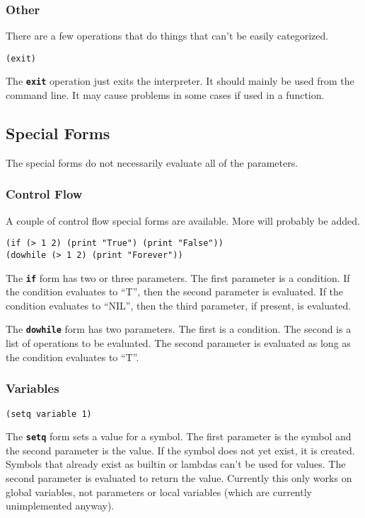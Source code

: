 \documentclass[10pt, openany]{book}
\newcommand{\operation}[1]{\textbf{\texttt{#1}}}
\begin{document}
\subsubsection{Other}
There are a few operations that do things that can't be easily categorized.
\begin{lstlisting}
(exit)
\end{lstlisting}
The \operation{exit} operation just exits the interpreter.  It should mainly be used from the command line.  It may cause problems in some cases if used in a function.

\subsection{Special Forms}
The special forms do not necessarily evaluate all of the parameters.

\subsubsection{Control Flow}
A couple of control flow special forms are available.  More will probably be added.
\begin{lstlisting}
(if (> 1 2) (print "True") (print "False"))
(dowhile (> 1 2) (print "Forever"))
\end{lstlisting}
The \operation{if} form has two or three parameters.  The first parameter is a condition.  If the condition evaluates to ``T'', then the second parameter is evaluated.  If the condition evaluates to ``NIL'', then the third parameter, if present, is evaluated.

The \operation{dowhile} form has two parameters.  The first is a condition.  The second is a list of operations to be evaluated.  The second parameter is evaluated as long as the condition evaluates to ``T''.

\subsubsection{Variables}
\begin{lstlisting}
(setq variable 1)
\end{lstlisting}
The \operation{setq} form sets a value for a symbol.  The first parameter is the symbol and the second parameter is the value.  If the symbol does not yet exist, it is created.  Symbols that already exist as builtin or lambdas can't be used for values.  The second parameter is evaluated to return the value.  Currently this only works on global variables, not parameters or local variables (which are currently unimplemented anyway).
\end{document}
